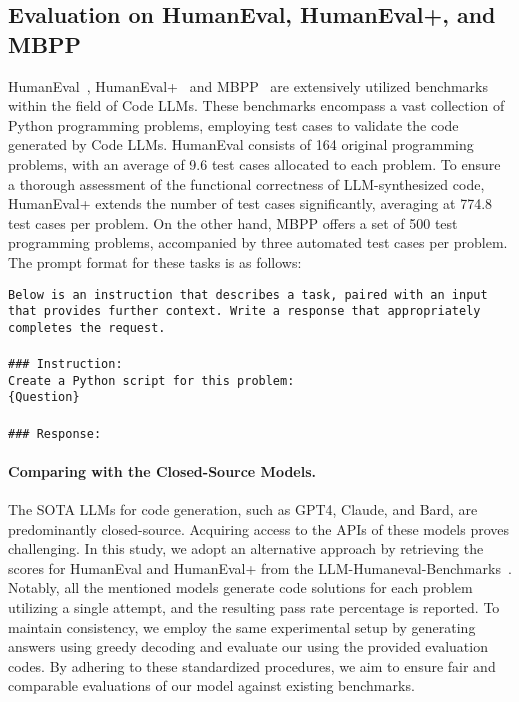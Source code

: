 \subsection{Evaluation on HumanEval, HumanEval+, and MBPP}

HumanEval~\cite{humeval}, HumanEval+~\cite{humanevalp} and MBPP~\cite{MBPP} are extensively utilized benchmarks within the field of Code LLMs. These benchmarks encompass a vast collection of Python programming problems, employing test cases to validate the code generated by Code LLMs. HumanEval consists of 164 original programming problems, with an average of 9.6 test cases allocated to each problem. To ensure a thorough assessment of the functional correctness of LLM-synthesized code, HumanEval+ extends the number of test cases significantly, averaging at 774.8 test cases per problem. On the other hand, MBPP offers a set of 500 test programming problems, accompanied by three automated test cases per problem. The prompt format for these tasks is as follows:
\begin{boxEnv}
\texttt{Below is an instruction that describes a task, paired with an input that provides further context. Write a response that appropriately completes the request. \\\\\#\#\# Instruction:\\
Create a Python script for this problem:\\\{Question\}\\ \\\#\#\# Response:}
\end{boxEnv}

\paragraph{Comparing with the Closed-Source Models.} The SOTA LLMs for code generation, such as GPT4, Claude, and Bard, are predominantly closed-source. Acquiring access to the APIs of these models proves challenging. In this study, we adopt an alternative approach by retrieving the scores for HumanEval and HumanEval+ from the LLM-Humaneval-Benchmarks~\cite{llm-humaneval-benchmarks}. Notably, all the mentioned models generate code solutions for each problem utilizing a single attempt, and the resulting pass rate percentage is reported. To maintain consistency, we employ the same experimental setup by generating answers using greedy decoding and evaluate our \modelname{} using the provided evaluation codes. By adhering to these standardized procedures, we aim to ensure fair and comparable evaluations of our model against existing benchmarks.

